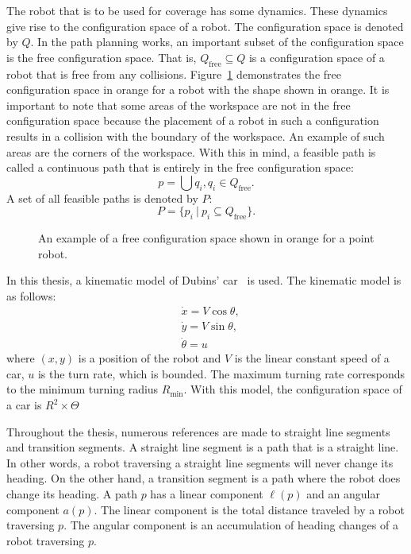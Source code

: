 \documentclass[../main.tex]{subfiles}
\begin{document}
The robot that is to be used for coverage has some dynamics. These dynamics give rise to the configuration space of a robot. The configuration space is denoted by $Q$. In the path planning works, an important subset of the configuration space is the free configuration space. That is, $Q_{\text{free}}\subseteq Q$ is a configuration space of a robot that is free from any collisions. Figure~\ref{fig:configuration_space} demonstrates the free configuration space in orange for a robot with the shape shown in orange. It is important to note that some areas of the workspace are not in the free configuration space because the placement of a robot in such a configuration results in a collision with the boundary of the workspace. An example of such areas are the corners of the workspace. With this in mind, a feasible path is called a continuous path that is entirely in the free configuration space:
\begin{equation}
	p=\bigcup q_i, q_i\in Q_{\text{free}}.
\end{equation}
A set of all feasible paths is denoted by $P$:
\begin{equation}
	P=\{p_i\ |\ p_i\subseteq Q_{\text{free}}\}.
\end{equation}

\begin{figure}
	\centering
	
	\caption{An example of a free configuration space shown in orange for a point robot.}
	\label{fig:configuration_space}
\end{figure}

In this thesis, a kinematic model of Dubins' car~\cite{dubins1957curves} is used. The kinematic model is as follows:
\begin{equation}
	\begin{aligned}
		& \dot{x}=V\cos{\theta},\\
		& \dot{y}=V\sin{\theta},\\
		& \dot{\theta}=u
	\end{aligned}
\end{equation}
where $(x,y)$ is a position of the robot and $V$ is the linear constant speed of a car, $u$ is the turn rate, which is bounded. The maximum turning rate corresponds to the minimum turning radius $R_{\min}$. With this model, the configuration space of a car is $R^2\times\Theta$

Throughout the thesis, numerous references are made to straight line segments and transition segments. A straight line segment is a path that is a straight line. In other words, a robot traversing a straight line segments will never change its heading. On the other hand, a transition segment is a path where the robot does change its heading. A path $p$ has a linear component $\ell(p)$ and an angular component $a(p)$. The linear component is the total distance traveled by a robot traversing $p$. The angular component is an accumulation of heading changes of a robot traversing $p$.
\end{document}
